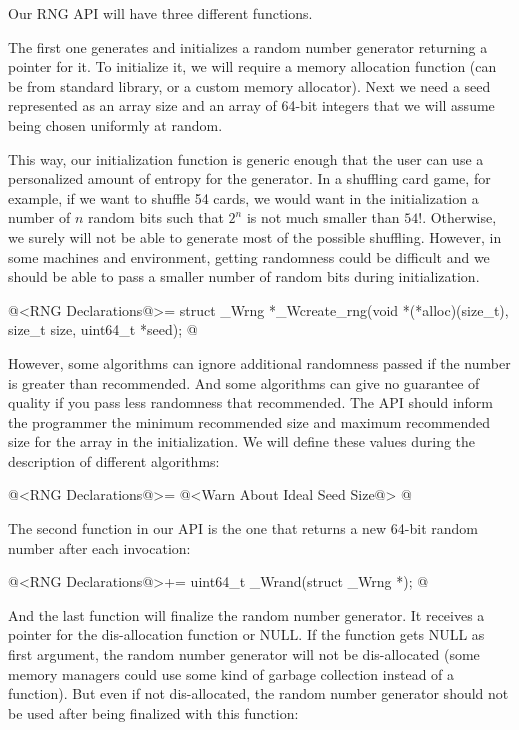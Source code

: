 
Our RNG API will have three different functions.

The first one generates and initializes a random number generator
returning a pointer for it. To initialize it, we will require a memory
allocation function (can be  from standard library,
or a custom memory allocator). Next we need a seed represented as an
array size and an array of 64-bit integers that we will assume being
chosen uniformly at random.

This way, our initialization function is generic enough that the user
can use a personalized amount of entropy for the generator. In a
shuffling card game, for example, if we want to shuffle 54 cards, we
would want in the initialization a number of $n$ random bits such that
$2^n$ is not much smaller than $54!$. Otherwise, we surely will not be
able to generate most of the possible shuffling. However, in some
machines and environment, getting randomness could be difficult and we
should be able to pass a smaller number of random bits during
initialization.

\iniciocodigo
@<RNG Declarations@>=
struct _Wrng *_Wcreate_rng(void *(*alloc)(size_t), size_t size, uint64_t *seed);
@
\fimcodigo

However, some algorithms can ignore additional randomness passed if
the number is greater than recommended. And some algorithms can give
no guarantee of quality if you pass less randomness that
recommended. The API should inform the programmer the minimum
recommended size and maximum recommended size for the array in the
initialization. We will define these values during the description of
different algorithms:

\iniciocodigo
@<RNG Declarations@>=
@<Warn About Ideal Seed Size@>
@
\fimcodigo

The second function in our API is the one that returns a new 64-bit
random number after each invocation:

\iniciocodigo
@<RNG Declarations@>+=
uint64_t _Wrand(struct _Wrng *);
@
\fimcodigo

And the last function will finalize the random number generator. It
receives a pointer for the dis-allocation function or NULL. If the
function gets NULL as first argument, the random number generator will
not be dis-allocated (some memory managers could use some kind of
garbage collection instead of a  function). But even
if not dis-allocated, the random number generator should not be used
after being finalized with this function:

